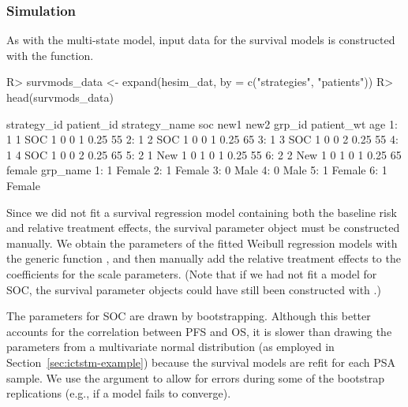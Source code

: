 \documentclass[article, nojss]{jss}\usepackage[]{graphicx}\usepackage[]{color}
\begin{document}
\subsubsection{Simulation}
As with  the multi-state model, input data for the survival models is constructed with the  function.

\begin{Schunk}
\begin{Sinput}
R> survmods_data <- expand(hesim_dat, by = c("strategies", "patients"))
R> head(survmods_data)
\end{Sinput}
\begin{Soutput}
   strategy_id patient_id strategy_name soc new1 new2 grp_id patient_wt age
1:           1          1           SOC   1    0    0      1       0.25  55
2:           1          2           SOC   1    0    0      1       0.25  65
3:           1          3           SOC   1    0    0      2       0.25  55
4:           1          4           SOC   1    0    0      2       0.25  65
5:           2          1         New 1   0    1    0      1       0.25  55
6:           2          2         New 1   0    1    0      1       0.25  65
   female grp_name
1:      1   Female
2:      1   Female
3:      0     Male
4:      0     Male
5:      1   Female
6:      1   Female
\end{Soutput}
\end{Schunk}

Since we did not fit a survival regression model containing both the baseline risk and relative treatment effects, the survival parameter object must be constructed manually. We obtain the parameters of the fitted Weibull regression models with the generic function , and then manually add the relative treatment effects to the coefficients for the scale parameters. (Note that if we had not fit a model for SOC, the survival parameter objects could have still been constructed with .) 

The parameters for SOC are drawn by bootstrapping. Although this better accounts for the correlation between PFS and OS, it is slower than drawing the parameters from a multivariate normal distribution (as employed in Section~\ref{sec:ictstm-example}) because the survival models are refit for each PSA sample. We use the  argument to allow for errors during some of the bootstrap replications (e.g., if a model fails to converge).
\end{document}

